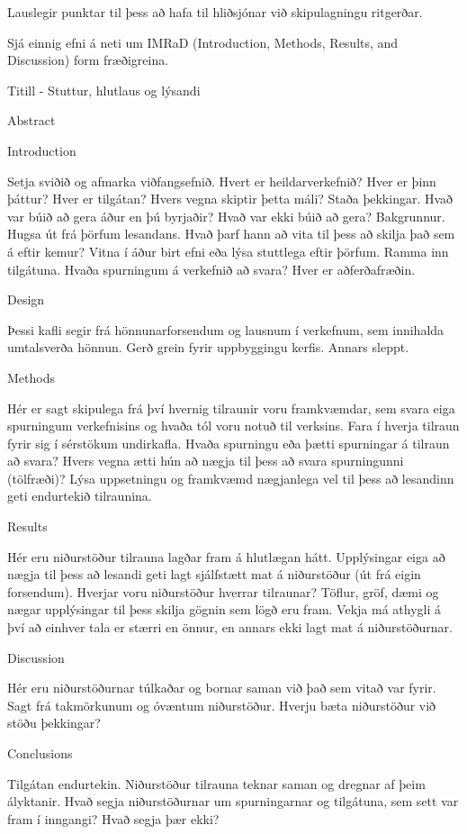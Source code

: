 Lauslegir punktar til þess að hafa til hliðsjónar við skipulagningu ritgerðar.

Sjá einnig efni á neti um IMRaD (Introduction, Methods, Results, and Discussion) form fræðigreina.

Titill - Stuttur, hlutlaus og lýsandi 

Abstract

Introduction

Setja sviðið og afmarka viðfangsefnið.  Hvert er heildarverkefnið?  Hver er þinn þáttur?  Hver er tilgátan? Hvers vegna skiptir þetta máli?  
Staða þekkingar.  Hvað var búið að gera áður en þú byrjaðir?  Hvað var ekki búið að gera?
Bakgrunnur.  Hugsa út frá þörfum lesandans.  Hvað þarf hann að vita til þess að skilja það sem á eftir kemur?  Vitna í áður birt efni eða lýsa stuttlega eftir þörfum.
Ramma inn tilgátuna.  Hvaða spurningum á verkefnið að svara?  Hver er aðferðafræðin.

Design

Þessi kafli segir frá hönnunarforsendum og lausnum í verkefnum, sem innihalda umtalsverða hönnun.  Gerð grein fyrir uppbyggingu kerfis.  Annars sleppt.

Methods

Hér er sagt skipulega frá því hvernig tilraunir voru framkvæmdar, sem svara eiga spurningum verkefnisins og hvaða tól voru notuð til verksins.
Fara í hverja tilraun fyrir sig í sérstökum undirkafla.  Hvaða spurningu eða þætti spurningar á tilraun að svara?  Hvers vegna ætti hún að nægja til þess að svara spurningunni (tölfræði)?  
Lýsa uppsetningu og framkvæmd nægjanlega vel til þess að lesandinn geti endurtekið tilraunina.

Results

Hér eru niðurstöður tilrauna lagðar fram á hlutlægan hátt.  Upplýsingar eiga að nægja til þess að lesandi geti lagt sjálfstætt mat á niðurstöður (út frá eigin forsendum).
Hverjar voru niðurstöður hverrar tilraunar?  Töflur, gröf, dæmi og nægar upplýsingar til þess skilja gögnin sem lögð eru fram.
Vekja má athygli á því að einhver tala er stærri en önnur, en annars ekki lagt mat á niðurstöðurnar.

Discussion

Hér eru niðurstöðurnar túlkaðar og bornar saman við það sem vitað var fyrir.
Sagt frá takmörkunum og óvæntum niðurstöður.  Hverju bæta niðurstöður við stöðu þekkingar?

Conclusions

Tilgátan endurtekin.  Niðurstöður tilrauna teknar saman og dregnar af þeim ályktanir.  Hvað segja niðurstöðurnar um spurningarnar og tilgátuna, sem sett var fram í inngangi?
Hvað segja þær ekki?

